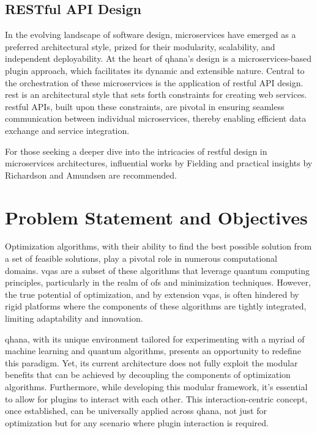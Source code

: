 \documentclass[
  a4paper,  %
  twoside,  %
  bibliography=totoc,
  headsepline,
  cleardoublepage=empty,
  parskip=half,
  draft=false
]{scrbook}
\begin{document}
\section{RESTful API Design}
In the evolving landscape of software design, microservices have emerged as a preferred architectural style, prized for their modularity, scalability, and independent deployability.
At the heart of \gls{qhana}'s design is a microservices-based plugin approach, which facilitates its dynamic and extensible nature.
Central to the orchestration of these microservices is the application of \gls{rest}ful API design.
\gls{rest} is an architectural style that sets forth constraints for creating web services.
\gls{rest}ful APIs, built upon these constraints, are pivotal in ensuring seamless communication between individual microservices, thereby enabling efficient data exchange and service integration.

For those seeking a deeper dive into the intricacies of \gls{rest}ful design in microservices architectures, influential works by Fielding \cite{Fielding2000} and practical insights by Richardson and Amundsen \cite{Richardson2013} are recommended.

\chapter{Problem Statement and Objectives}
\label{chap:problem}

Optimization algorithms, with their ability to find the best possible solution from a set of feasible solutions, play a pivotal role in numerous computational domains.
\glspl{vqa} are a subset of these algorithms that leverage quantum computing principles, particularly in the realm of \glspl{of} and minimization techniques.
However, the true potential of optimization, and by extension \glspl{vqa}, is often hindered by rigid platforms where the components of these algorithms are tightly integrated, limiting adaptability and innovation.

\gls{qhana}, with its unique environment tailored for experimenting with a myriad of machine learning and quantum algorithms, presents an opportunity to redefine this paradigm.
Yet, its current architecture does not fully exploit the modular benefits that can be achieved by decoupling the components of optimization algorithms.
Furthermore, while developing this modular framework, it's essential to allow for plugins to interact with each other.
This interaction-centric concept, once established, can be universally applied across \gls{qhana}, not just for optimization but for any scenario where plugin interaction is required.
\end{document}
